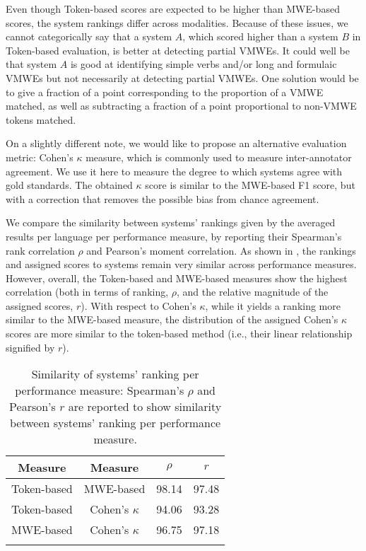 \documentclass[output=paper
,modfonts
,nonflat,draftmode]{langsci/langscibook}
\begin{document}
Even though Token-based scores are expected to be higher than MWE-based scores, the system rankings differ across modalities. Because of these issues, we cannot categorically say that a system $A$, which scored higher than a system $B$ in Token-based evaluation, is better at detecting partial VMWEs. It could well be that system $A$ is good at identifying simple verbs and/or long and formulaic VMWEs but not necessarily at detecting partial VMWEs. One solution would be to give a fraction of a point corresponding to the proportion of a VMWE matched, as well as subtracting a fraction of a point proportional to non-VMWE tokens matched. 

On a slightly different note, we would like to propose an alternative evaluation metric: Cohen's $\kappa$ measure, which is commonly used to measure inter-annotator agreement. We use it here to measure the degree to which systems agree with gold standards. The obtained $\kappa$ score is similar to the MWE-based F1 score, but with a correction that removes the possible bias from chance agreement. 

We compare the similarity between systems' rankings given by the averaged results per language per performance measure, by reporting their Spearman's rank correlation $\rho$ and Pearson's moment correlation. As shown in , the rankings and assigned scores to systems remain very similar across performance measures. However, overall, the Token-based and MWE-based measures show the highest correlation (both in terms of ranking, $\rho$, and the relative magnitude of the assigned scores, $r$). With respect to Cohen's $\kappa$, while it yields a ranking more similar to the MWE-based measure, the distribution of the assigned Cohen's $\kappa$ scores are more similar to the token-based method (i.e., their linear relationship signified by $r$).

\begin{table}
\centering
\caption{Similarity of systems' ranking per performance measure: Spearman's $\rho$ and Pearson's $r$ %
are reported to show similarity between systems' ranking per performance measure.}
\label{similarity-of-measures}
\begin{tabular}{cccc}%
\lsptoprule
Measure & Measure & $\rho$ & $r$ \tabularnewline
\midrule
Token-based & MWE-based        & 98.14 & 97.48 \tabularnewline
Token-based & Cohen's $\kappa$ & 94.06 & 93.28 \tabularnewline
MWE-based   & Cohen's $\kappa$ & 96.75 & 97.18 \tabularnewline
\lspbottomrule
\end{tabular}
\end{table}
\end{document}
